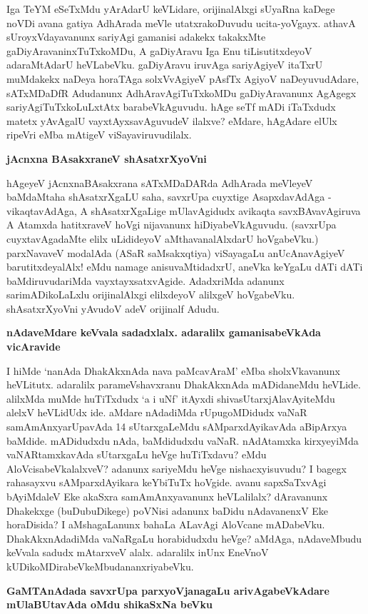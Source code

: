 Iga TeYM eSeTxMdu yArAdarU keVLidare, orijinalAlxgi sUyaRna kaDege noVDi avana gatiya AdhArada meVle utatxrakoDuvudu ucita-yoVgayx. athavA sUroyxVdayavanunx sariyAgi gamanisi adakekx takakxMte gaDiyAravaninxTuTxkoMDu, A gaDiyAravu Iga Enu tiLisutitxdeyoV adaraMtAdarU heVLabeVku. gaDiyAravu iruvAga sariyAgiyeV itaTxrU muMdakekx naDeya horaTAga solxVvAgiyeV pAsfTx AgiyoV  naDeyuvudAdare, sATxMDaDfR Adudanunx AdhAravAgiTuTxkoMDu gaDiyAravanunx AgAgegx sariyAgiTuTxkoLuLxtAtx barabeVkAguvudu. hAge seTf mADi iTaTxdudx matetx yAvAgalU vayxtAyxsavAguvudeV ilalxve? eMdare, hAgAdare elUlx ripeVri eMba mAtigeV viSayaviruvudilalx.

\noindent
{\bf\large{jAcnxna BAsakxraneV shAsatxrXyoVni}}\label{page168}

hAgeyeV jAcnxnaBAsakxrana sATxMDaDARda AdhArada meVleyeV baMdaMtaha shAsatxrXgaLU saha, savxrUpa cuyxtige AsapxdavAdAga - vikaqtavAdAga, A shAsatxrXgaLige mUlavAgidudx avikaqta savxBAvavAgiruva A Atamxda hatitxraveV hoVgi nijavanunx hiDiyabeVkAguvudu. (savxrUpa cuyxtavAgadaMte elilx uLidideyoV aMthavanalAlxdarU hoVgabeVku.) parxNavaveV modalAda (ASaR saMsakxqtiya) viSayagaLu anUcAnavAgiyeV barutitxdeyalAlx! eMdu namage anisuvaMtidadxrU, aneVka keYgaLu dATi dATi baMdiruvudariMda vayxtayxsatxvAgide. AdadxriMda adanunx sarimADikoLaLxlu orijinalAlxgi elilxdeyoV alilxgeV hoVgabeVku. shAsatxrXyoVni yAvudoV adeV orijinalf Adudu.

\noindent
{\bf\large{nAdaveMdare keVvala sadadxlalx. adaralilx gamanisabeVkAda vicAravide}}\label{page169}

I hiMde `nanAda DhakAkxnAda nava paMcavAraM' eMba sholxVkavanunx heVLitutx. adaralilx parameVshavxranu DhakAkxnAda mADidaneMdu heVLide. alilxMda muMde huTiTxdudx `a i uNf' itAyxdi shivasUtarxjAlavAyiteMdu alelxV heVLidUdx ide. aMdare nAdadiMda rUpugoMDidudx vaNaR samAmAnxyarUpavAda 14 sUtarxgaLeMdu sAMparxdAyikavAda aBipArxya baMdide. mADidudxdu nAda, baMdidudxdu vaNaR. nAdAtamxka kirxyeyiMda vaNARtamxkavAda sUtarxgaLu heVge huTiTxdavu? eMdu AloVcisabeVkalalxveV? adanunx sariyeMdu heVge nishacxyisuvudu? I bagegx rahasayxvu sAMparxdAyikara keYbiTuTx hoVgide. avanu sapxSaTxvAgi bAyiMdaleV Eke akaSxra samAmAnxyavanunx heVLalilalx? dAravanunx Dhakekxge (buDubuDikege) poVNisi adanunx baDidu nAdavanenxV Eke horaDisida? I aMshagaLanunx bahaLa ALavAgi AloVcane mADabeVku. DhakAkxnAdadiMda vaNaRgaLu horabidudxdu heVge? aMdAga, nAdaveMbudu keVvala sadudx mAtarxveV alalx. adaralilx inUnx EneVnoV kUDikoMDirabeVkeMbudananxriyabeVku.

\noindent
{\bf\large{GaMTAnAdada savxrUpa parxyoVjanagaLu arivAgabeVkAdare mUlaBUtavAda oMdu shikaSxNa beVku}}\label{page169}

